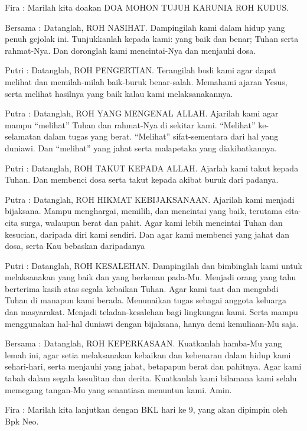 \documentclass[12pt]{article}
\begin{document}
Fira : Marilah kita doakan DOA MOHON TUJUH KARUNIA ROH KUDUS. 

Bersama : Datanglah, ROH NASIHAT. Dampingilah kami dalam hidup yang
penuh gejolak ini. Tunjukkanlah kepada kami:  yang baik dan benar;
Tuhan serta rahmat-Nya. Dan doronglah kami mencintai-Nya dan menjauhi
dosa. 

Putri : Datanglah, ROH PENGERTIAN. Terangilah budi kami agar dapat
melihat dan memilah-milah baik-buruk benar-salah. Memahami ajaran
Yesus, serta melihat hasilnya yang baik kalau kami melaksanakannya. 

Putra : Datanglah, ROH YANG MENGENAL ALLAH. Ajarilah kami agar mampu
{\textquotedblleft}melihat{\textquotedblright} Tuhan dan rahmat-Nya di
sekitar kami. {\textquotedblleft}Melihat{\textquotedblright}
ke-selamatan dalam tugas yang berat.
{\textquotedblleft}Melihat{\textquotedblright} sifat-sementara dari hal
yang duniawi. Dan {\textquotedblleft}melihat{\textquotedblright} yang
jahat serta malapetaka yang diakibatkannya. 

Putri : Datanglah, ROH TAKUT KEPADA ALLAH. Ajarlah kami takut kepada
Tuhan. Dan membenci dosa serta takut kepada akibat buruk dari padanya.

Putra : Datanglah, ROH HIKMAT KEBIJAKSANAAN. Ajarilah kami menjadi
bijaksana. Mampu menghargai, memilih, dan mencintai yang baik, terutama
cita-cita surga, walaupun berat dan pahit. Agar kami lebih mencintai
Tuhan dan kesucian, daripada diri kami sendiri. Dan agar kami membenci
yang jahat dan dosa, serta Kau bebaskan daripadanya 

Putri : Datanglah, ROH KESALEHAN. Dampingilah dan bimbinglah kami untuk
melaksanakan yang baik dan yang berkenan pada-Mu. Menjadi orang yang
tahu berterima kasih atas segala kebaikan Tuhan. Agar kami taat dan
mengabdi Tuhan di manapun kami berada. Menunaikan tugas sebagai anggota
keluarga dan masyarakat. Menjadi teladan-kesalehan bagi lingkungan
kami. Serta mampu menggunakan hal-hal duniawi dengan bijaksana, hanya
demi kemuliaan-Mu saja. 

Bersama : Datanglah, ROH KEPERKASAAN. Kuatkanlah hamba-Mu yang lemah
ini, agar setia melaksanakan kebaikan dan kebenaran dalam hidup kami
sehari-hari, serta menjauhi yang jahat, betapapun berat dan pahitnya.
Agar kami tabah dalam segala kesulitan dan derita. Kuatkanlah kami
bilamana kami selalu memegang tangan-Mu yang senantiasa menuntun kami.
Amin. 

Fira : Marilah kita lanjutkan dengan BKL hari ke 9, yang akan dipimpin
oleh Bpk Neo.
\end{document}
